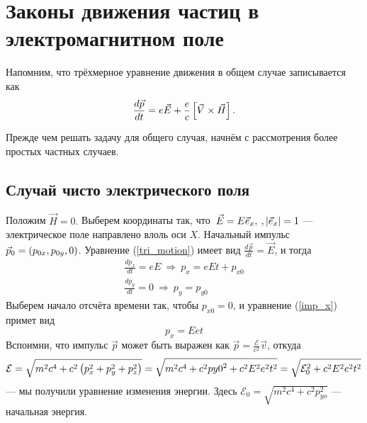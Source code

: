 \newpage
\section{Законы движения частиц в электромагнитном поле}
Напомним, что трёхмерное уравнение движения в общем случае записывается как
\begin{equation}
    \frac{d\vec{p}}{dt} = e\vec{E} + \frac ec \left[{\vec{V}\times\vec{H}}\right]. \label{tri_motion}
\end{equation}
    
Прежде чем решать задачу для общего случая, начнём с рассмотрения более простых частных случаев.
\subsection{Случай чисто электрического поля}
    Положим $\vec{H} = 0.$
    Выберем координаты так, что $\: \vec{E} = E\vec{e}_x, \:, \left|{\vec{e}_x}\right| = 1$ --- электрическое поле направлено влоль оси $X$.
    Начальный импульс $\vec{p}_0 = \left({p_{0x}, p_{0y}, 0}\right)$. Уравнение (\ref{tri_motion}) имеет вид $\displaystyle \frac{d\vec{p}}{dt} = \vec{E}$, и тогда
    \begin{gather}
        \frac{dp_x}{dt} = eE \: \Rightarrow \: p_x = eEt + p_{x0} \label{imp_x} \\
        \frac{dp_y}{dt} = 0  \: \Rightarrow \: p_y = p_{y0}
    \end{gather}
    Выберем начало отсчёта времени так, чтобы $p_{x0} = 0$, и уравнение (\ref{imp_x}) примет вид
    \[
        p_x = Eet
    \]
    Вспоимни, что импульс $\vec{p}$ может быть выражен как $\vec{p} = \frac{\mathcal{E}}{c^2}\vec{v}$, откуда
    \[
    \mathcal{E} = \sqrt{m^2c^4 + c^2 \left({p_x^2 + p_y^2 + p_z^2}\right)} = \sqrt{m^2c^4 + c^2p{y0}^2 + c^2E^2e^2t^2} = \sqrt{\mathcal{E}_0^2 + c^2E^2e^2t^2}
    \]
    --- мы получили уравнение изменения энергии. Здесь $\mathcal{E}_0 = \sqrt{m^2c^4 + c^2 p_{yo}^2}$ --- начальная энергия.

